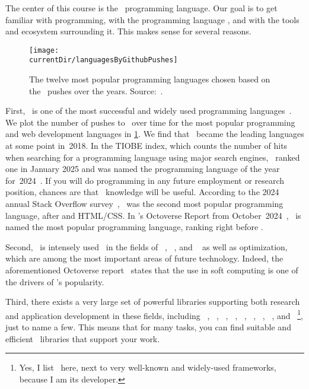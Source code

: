 %
%
The center of this course is the \python\ programming language.
Our goal is to get familiar with programming, with the programming language \python, and with the tools and ecosystem surrounding it.
This makes sense for several reasons.%
%
\begin{figure}%
\centering%
\texttt{[image: \\currentDir/languagesByGithubPushes]}%
\caption{The twelve most popular programming languages chosen based on the \github\ pushes over the years. Source:~\cite{B2023G2GLS}.}%
\label{fig:languagesByGithubPushes}%
\end{figure}%

First, \python\ is one of the most successful and widely used programming languages~\cite{CBST2024LOHPPTDDSAMLA}.
We plot the number of pushes to \github\ over time for the most popular programming and web development languages in \cref{fig:languagesByGithubPushes}.
We find that \python\ became the leading languages at some point in~2018.
In the TIOBE index, which counts the number of hits when searching for a programming language using major search engines, \python\ ranked one in January 2025 and was named the programming language of the year for~2024~\cite{J2025TIFJ2JHPITPLOTY2}.%
%
%
%
If you will do programming in any future employment or research position, chances are that \python\ knowledge will be useful.
According to the 2024 annual Stack Overflow survey~\cite{Y2025DWMMMT2RFSOADS}, \python\ was the second most popular programming language, after  and HTML/CSS.
In \github's Octoverse Report from October~2024~\cite{GS2024OALPTTLATNOGDS}, \python\ is named the most popular programming language, ranking right before .

Second, \python\ is intensely used~\cite{CBST2024LOHPPTDDSAMLA} in the fields of ~\cite{RN2022AIAMA}, ~\cite{SSBD2014UMLFTTA}, and ~\cite{G2019DSFSFPWP} as well as optimization, which are among the most important areas of future technology.
Indeed, the aforementioned Octoverse report~\cite{GS2024OALPTTLATNOGDS} states that the use in soft computing is one of the drivers of \python's popularity.

Third, there exists a very large set of powerful libraries supporting both research and application development in these fields, including \numpy~\cite{HMvdWGVCWTBSKPHvKBHFdRWPGMSRWAGO2020APWN,DBvR2024ITN,J2018NPSCADSAWNSAM}, \pandas~\cite{B2012DPWP,L2024PW}, \scikitlearn~\cite{PVGMTGBPWDVPCBPD2011SMLIP,RLM2022MLWPAS}, \scipy~\cite{VGOHRCBPWBvdWBWMMNJKLCPFMVLPCHQHARPvMS2020SFAFSCIP,J2018NPSCADSAWNSAM}, \tensorflow~\cite{ABCCDDDGIIKLMMMSTVWWYZ2016TASFLSML,L2023TDDBTADMLMWT}, \pytorch~\cite{PGMLBCKLGADKYDRTCSFBC2019PAISHPDLL,RLM2022MLWPAS}, \matplotlib~\cite{H2007MA2GE,P2021HOMLPAVWP,J2018NPSCADSAWNSAM}, \simpy~\cite{Z2024DESIEWS}, and \moptipy~\cite{WW2023RSDEWASSAA}\footnote{Yes, I list \moptipy\ here, next to very well-known and widely-used frameworks, because I am its developer.}, just to name a few.
This means that for many tasks, you can find suitable and efficient \python\ libraries that support your work.

